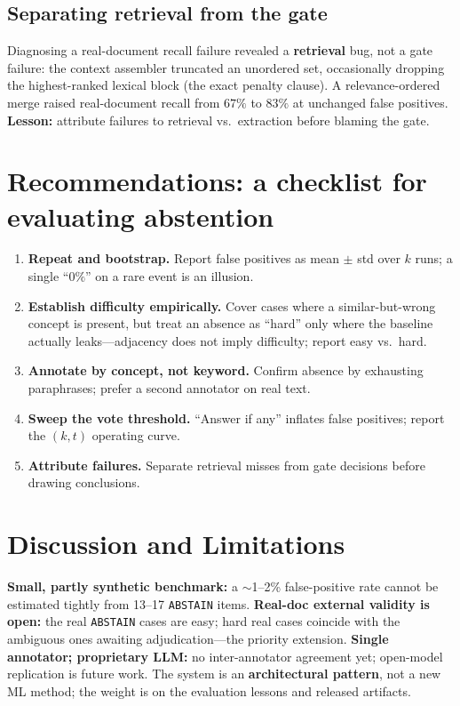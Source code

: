 \documentclass[11pt]{article}
\begin{document}
\subsection{Separating retrieval from the gate}
\label{sec:pe}
Diagnosing a real-document recall failure revealed a \textbf{retrieval} bug, not a
gate failure: the context assembler truncated an unordered set, occasionally
dropping the highest-ranked lexical block (the exact penalty clause). A
relevance-ordered merge raised real-document recall from $67\%$ to $83\%$ at
unchanged false positives. \textbf{Lesson:} attribute failures to retrieval vs.\
extraction before blaming the gate.

\section{Recommendations: a checklist for evaluating abstention}
\begin{enumerate}
  \item \textbf{Repeat and bootstrap.} Report false positives as mean $\pm$ std
  over $k$ runs; a single ``$0\%$'' on a rare event is an illusion.
  \item \textbf{Establish difficulty empirically.} Cover cases where a
  similar-but-wrong concept is present, but treat an absence as ``hard'' only
  where the baseline actually leaks---adjacency does not imply difficulty; report
  easy vs.\ hard.
  \item \textbf{Annotate by concept, not keyword.} Confirm absence by exhausting
  paraphrases; prefer a second annotator on real text.
  \item \textbf{Sweep the vote threshold.} ``Answer if any'' inflates false
  positives; report the $(k,t)$ operating curve.
  \item \textbf{Attribute failures.} Separate retrieval misses from gate
  decisions before drawing conclusions.
\end{enumerate}

\section{Discussion and Limitations}
\textbf{Small, partly synthetic benchmark:} a $\sim$1--2\% false-positive rate
cannot be estimated tightly from 13--17 \texttt{ABSTAIN} items. \textbf{Real-doc
external validity is open:} the real \texttt{ABSTAIN} cases are easy; hard real
cases coincide with the ambiguous ones awaiting adjudication---the priority
extension. \textbf{Single annotator; proprietary LLM:} no inter-annotator
agreement yet; open-model replication is future work. The system is an
\textbf{architectural pattern}, not a new ML method; the weight is on the
evaluation lessons and released artifacts.
\end{document}
